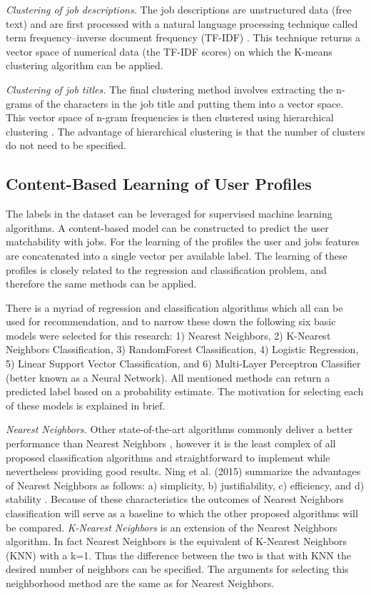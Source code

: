 \textit{Clustering of job descriptions.}
The job descriptions are unstructured data (free text) and are first processed with a natural language processing technique called term frequency–inverse document frequency (TF-IDF) \cite{ramos2003using}. 
This technique returns a vector space of numerical data (the TF-IDF scores) on which the K-means clustering algorithm \cite{hartigan1979algorithm} can be applied. 

\textit{Clustering of job titles.}
The final clustering method involves extracting the n-grams of the characters in the job title and putting them into a vector space.
This vector space of n-gram frequencies is then clustered using hierarchical clustering \cite{rokach2005clustering}. 
The advantage of hierarchical clustering is that the number of clusters do not need to be specified. 

\subsection{Content-Based Learning of User Profiles}
\label{ssec:cblup}
The labels in the dataset can be leveraged for supervised machine learning algorithms. 
A content-based model can be constructed to predict the user matchability with jobs. 
For the learning of the profiles the user and jobs features are concatenated into a single vector per available label. 
The learning of these profiles is closely related to the regression and classification problem, and therefore the same methods can be applied. 

There is a myriad of regression and classification algorithms which all can be used for recommendation, and to narrow these down the following six basic models were selected for this research: 1) Nearest Neighbors, 2) K-Nearest Neighbors Classification, 3) RandomForest Classification, 4) Logistic Regression, 5) Linear Support Vector Classification, and 6) Multi-Layer Perceptron Classifier (better known as a Neural Network).
All mentioned methods can return a predicted label based on a probability estimate.
The motivation for selecting each of these models is explained in brief.

\textit{Nearest Neighbors.}
Other state-of-the-art algorithms commonly deliver a better performance than Nearest Neighbors \cite{koren2008factorization, takacs2007major}, however it is the least complex of all proposed classification algorithms and straightforward to implement while nevertheless providing good results.
Ning et al. (2015) summarize the advantages of Nearest Neighbors as follows: a) simplicity, b) justifiability, c) efficiency, and d) stability \cite{ning2015comprehensive}.
Because of these characteristics the outcomes of Nearest Neighbors classification will serve as a baseline to which the other proposed algorithms will be compared.
\textit{K-Nearest Neighbors} \cite{altman1992introduction} is an extension of the Nearest Neighbors algorithm. 
In fact Nearest Neighbors is the equivalent of K-Nearest Neighbors (KNN) with a k=1. 
Thus the difference between the two is that with KNN the desired number of neighbors can be specified.
The arguments for selecting this neighborhood method are the same as for Nearest Neighbors.

